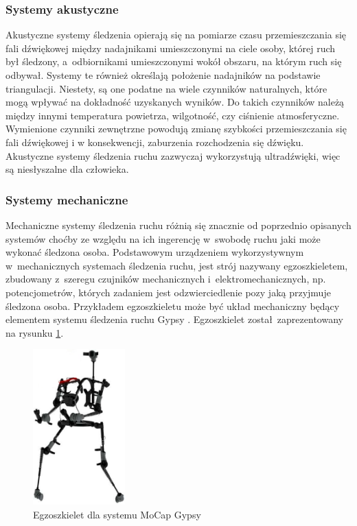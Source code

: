 \subsubsection*{Systemy akustyczne}
Akustyczne systemy śledzenia opierają się na pomiarze czasu przemieszczania się fali dźwiękowej między nadajnikami umieszczonymi na ciele osoby, której ruch był śledzony, a~odbiornikami umieszczonymi wokół obszaru, na którym ruch się odbywał. Systemy te również określają położenie nadajników na podstawie triangulacji. Niestety, są one podatne na wiele czynników naturalnych, które mogą wpływać na dokładność uzyskanych wyników. Do takich czynników należą między innymi temperatura powietrza, wilgotność, czy ciśnienie atmosferyczne. Wymienione czynniki zewnętrzne powodują zmianę szybkości przemieszczania się fali dźwiękowej i w konsekwencji, zaburzenia rozchodzenia się dźwięku. Akustyczne systemy śledzenia ruchu zazwyczaj wykorzystują ultradźwięki, więc są niesłyszalne dla człowieka.
									
\subsubsection*{Systemy mechaniczne}
Mechaniczne systemy śledzenia ruchu różnią się znacznie od poprzednio opisanych systemów choćby ze względu na ich ingerencję w~swobodę ruchu jaki może wykonać śledzona osoba. Podstawowym urządzeniem wykorzystywnym w~mechanicznych systemach śledzenia ruchu, jest strój nazywany egzoszkieletem, zbudowany z~szeregu czujników mechanicznych i~elektromechanicznych, np. potencjometrów, których zadaniem jest odzwierciedlenie pozy jaką przyjmuje śledzona osoba. Przykładem egzoszkieletu może być układ mechaniczny będący elementem systemu śledzenia ruchu Gypsy . Egzoszkielet został~zaprezentowany na rysunku \ref{fig:literature:footnote:gypsy:full}.
									
\begin{savenotes}
	\begin{figure}[!htp]
		\centering	
		\includegraphics[height=6cm]{images/gypsy7_full.jpg}
		\caption{Egzoszkielet dla systemu MoCap Gypsy}	
		\label{fig:literature:footnote:gypsy:full}
	\end{figure}
\end{savenotes}
											
